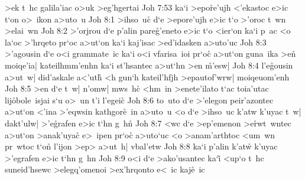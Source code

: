 >ek
t~hc
galila'iac
o>uk
>eg'hgertai\bibvsend
\vs Joh 7:53
ka`i
>epo\r{r}e'ujh
<'ekastoc
e>ic
t`on
o>~ikon
a>uto~u\bibvsend
\vs Joh 8:1
>ihso~uc\r{}
d`e
>epore'ujh
e>ic
t`o
>'oroc
t~wn
>elai~wn\bibvsend
\vs Joh 8:2
>'orjrou
d`e
p'alin
pa\-re\-\r{g}'e\-ne\-to
e>ic
t`o
<ier`on
ka`i
p~ac
<o
la`oc
>'hrqeto
pr`oc
a>ut`on
ka`i
kaj'isac
>ed'idasken
a>uto'uc\bibvsend
\vs Joh 8:3
>'agousin
d`e
o<i
grammate~ic
ka`i
o<i
vfarisa~ioi
pr`oc\r{}
a>ut`on
guna~ika
>e\r{n}
moiqe'ia|
kateilhmm'enhn
ka`i
st'hsantec
a>ut`hn
>en
\r{m}'esw|\bibvsend
{}
\vs Joh 8:4
l'e\r{g}ousin
a>ut~w|
did'askale
a<'uth\r{}
<h
gun`h
kateil'hfjh
>epautof'wrw|
moiqeuom'enh\bibvsend
\vs Joh 8:5
>en
d`e
t~w|
n'omw|
mws~hc\r{}
<hm~in
>enete'ilato
t`ac
toia'utac
lij\r{o}bole~isjai
s`u
o>~un
t'i
l'egei\r{c}\bibvsend
{}
\vs Joh 8:6
to~uto
d`e
>'elegon
peir'azontec
a>ut`on
<'ina
>'eqwsin
kathgor\r{e}~in
a>uto~u
<o
d`e
>ihso~uc
k'atw
k'uyac
t~w|
dakt'ulw|
>'e\r{g}rafen
e>ic
t`hn
g~h\r{n}\bibvsend
{}
\vs Joh 8:7
<wc
d`e
>ep'emenon
>e\r{r}wt~wntec
a>ut`on
>anak'uya\r{c}
e>~ipen
pr`oc\r{}
a>uto`uc
<o
>anam'arthtoc
<um~wn
pr~wtoc
t`on\r{}
l'ijon
>ep>
a>ut~h|
vbal'etw\bibvsend
\vs Joh 8:8
ka`i
p'alin
k'atw\r{}
k'uyac
>'egrafen
e>ic
t`hn
g~hn\bibvsend
\vs Joh 8:9
o<i
d`e
>ako'usantec
ka`i\r{}
<up`o
t~hc
suneid'hsewc
>elegq'omenoi
>ex'hrqonto
e<~ic
kaj\r{e}~ic
